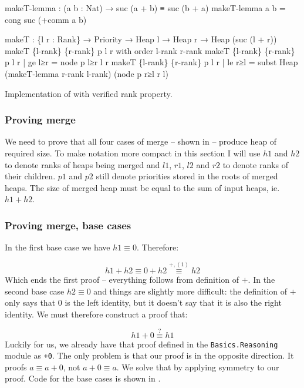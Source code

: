 \begin{listing}[thb!]
\begin{code}
makeT-lemma : (a b : Nat) → suc (a + b) ≡ suc (b + a)
makeT-lemma a b = cong suc (+comm a b)

makeT : \{l r : Rank\} → Priority → Heap l → Heap r → Heap (suc (l + r))
makeT \{l-rank\} \{r-rank\} p l r with order l-rank r-rank
makeT \{l-rank\} \{r-rank\} p l r | ge l≥r
  = node p l≥r l r
makeT \{l-rank\} \{r-rank\} p l r | le r≥l
  = subst Heap (makeT-lemma r-rank l-rank) (node p r≥l r l)
\end{code}
\caption{Implementation of \makeT with verified rank property.}\label{lst:rank-proof-makeT-two-pass}
\end{listing}

\subsubsection{Proving merge}

We need to prove that all four cases of merge -- shown in  -- produce heap of required size. To make notation more compact in this section I will use $h1$ and $h2$ to denote ranks of heaps being merged and $l1$, $r1$, $l2$ and $r2$ to denote ranks of their children. $p1$ and $p2$ still denote priorities stored in the roots of merged heaps. The size of merged heap must be equal to the sum of input heaps, ie. $h1 + h2$.

\subsubsection{Proving merge, base cases}

In the first base case we have $h1 ≡ 0$. Therefore:

\begin{equation*}
h1 + h2 ≡ 0 + h2 \stackrel{+, (1)}{≡} h2
\end{equation*}
\noindent
Which ends the first proof -- everything follows from definition of $+$. In the second base case $h2 ≡ 0$ and things are slightly more difficult: the definition of $+$ only says that $0$ is the left identity, but it doesn't say that it is also the right identity. We must therefore construct a proof that:

\begin{equation*}
h1 + 0 \stackrel{?}{≡} h1
\end{equation*}
\noindent
Luckily for us, we already have that proof defined in the \texttt{Basics.Reasoning} module as \texttt{+0}. The only problem is that our proof is in the opposite direction. It proofs $a ≡ a + 0$, not $a + 0 ≡ a$. We solve that by applying symmetry to our proof. Code for the base cases is shown in .

